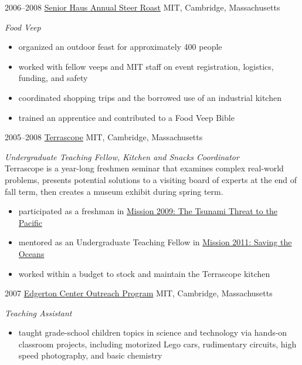 \documentclass[]{friggeri-cv}
\begin{document}
\begin{entrylist}
  \entry
	{2006--2008}
	{\href{http://web.mit.edu/senior-house/www/steerroast.html}{Senior Haus Annual Steer Roast}}
	{MIT, Cambridge, Massachusetts}
	{\emph{Food Veep}
	\begin{itemize}
		\item organized an outdoor feast for approximately 400 people
		\item worked with fellow veeps and MIT staff on event registration, logistics, funding, and safety
		\item coordinated shopping trips and the borrowed use of an industrial kitchen
		\item trained an apprentice and contributed to a Food Veep Bible
	\end{itemize}
	}
	
  \entry
	{2005--2008}
	{\href{http://web.mit.edu/terrascope/www/}{Terrascope}}
	{MIT, Cambridge, Massachusetts}
	{\emph{Undergraduate Teaching Fellow, Kitchen and Snacks Coordinator} \\
	Terrascope is a year-long freshmen seminar that examines complex real-world problems, presents potential solutions to a visiting board of experts at the end of fall term, then creates a museum exhibit during spring term. 
	\begin{itemize}
		\item participated as a freshman in \href{http://web.mit.edu/12.000/www/m2009/finalwebsite/}{Mission 2009: The Tsunami Threat to the Pacific}
		\item mentored as an Undergraduate Teaching Fellow in \href{http://web.mit.edu/12.000/www/m2011/finalwebsite/}{Mission 2011: Saving the Oceans}
		\item worked within a budget to stock and maintain the Terrascope kitchen
	\end{itemize}
	}
	
  \entry
	{2007}
	{\href{http://edgerton.mit.edu/outreach}{Edgerton Center Outreach Program}}
	{MIT, Cambridge, Massachusetts}
	{\emph{Teaching Assistant} 
	\begin{itemize}
		\item taught grade-school children topics in science and technology via hands-on classroom projects, including motorized Lego cars, rudimentary circuits, high speed photography, and basic chemistry
	\end{itemize}
	}
	
\end{entrylist}
\end{document}
